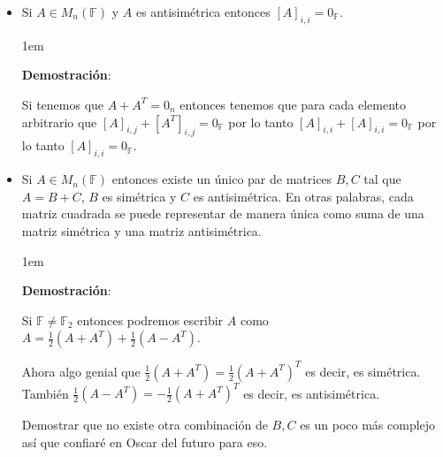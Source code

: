 \documentclass[12pt]{report}                                    %
\newenvironment{SmallIndentation}[1][0.75em]                    %
    {\begin{adjustwidth}{#1}{}\begin{footnotesize}}                 %
    {\end{footnotesize}\end{adjustwidth}}                           %
\begin{document}
                    \begin{itemize}

                        \item Si $A \in M_{n}(\mathbb{F})$ y $A$ es antisimétrica entonces 
                            $[A]_{i,i} = 0_{\mathbb{F}}$.

                            \begin{SmallIndentation}[1em]
                                \textbf{Demostración}:

                                Si tenemos que $A + A^T = 0_{n}$ entonces tenemos que para cada
                                elemento arbitrario que $[A]_{i,j} + [A^T]_{i,j} = 0_{\mathbb{F}}$
                                por lo tanto $[A]_{i,i} + [A]_{i,i} = 0_{\mathbb{F}}$ por lo tanto 
                                $[A]_{i,i} = 0_{\mathbb{F}}$.

                            \end{SmallIndentation}

                        \item Si $A \in M_{n}(\mathbb{F})$ entonces existe un único par de matrices $B,C$
                            tal que $A = B + C$, $B$ es simétrica y $C$ es antisimétrica. 
                            En otras palabras, cada matriz cuadrada se puede representar de manera única
                            como suma de una matriz simétrica y una matriz antisimétrica.

                            \begin{SmallIndentation}[1em]
                                \textbf{Demostración}:

                                Si $\mathbb{F} \neq \mathbb{F}_2$ entonces podremos escribir $A$ como
                                $A = \frac{1}{2}(A + A^T) + \frac{1}{2}(A - A^T)$.

                                Ahora algo genial que $\frac{1}{2}(A + A^T)=\frac{1}{2}(A + A^T)^T$ es
                                decir, es simétrica.
                                También $\frac{1}{2}(A - A^T)=-\frac{1}{2}(A + A^T)^T$ es decir, es
                                antisimétrica.

                                Demostrar que no existe otra combinación de $B,C$ es un poco más complejo
                                así que confiaré en Oscar del futuro para eso.


\end{SmallIndentation}
\end{itemize}
\end{document}
